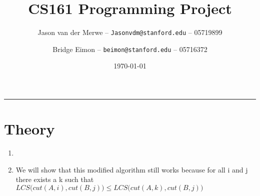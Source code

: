 \documentclass[12pt]{article}
\title{CS161 Programming Project}
\author{Jason van der Merwe -- \texttt{Jasonvdm@stanford.edu} -- 05719899}
\author{Bridge Eimon -- \texttt{beimon@stanford.edu} -- 05716372}
\date{\today}
\begin{document}
\maketitle

\vspace{-0.3in}
\rule{\linewidth}{0.4pt}


\section*{Theory}
\begin{enumerate}
    \item 
    \item We will show that this modified algorithm still works because for all i and j there exists a k such that $LCS\big(cut(A,i), cut(B,j)\big) \le LCS\big(cut(A,k), cut(B,j)\big)$ 
    

\end{enumerate}
\end{document}
